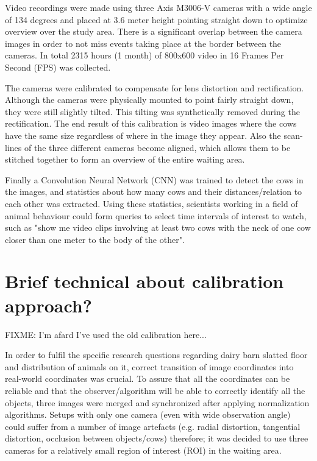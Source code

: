 \documentclass[10pt,a4paper,twocolumn]{article}
\begin{document}
Video recordings were made using three Axis M3006-V cameras with a wide angle of 134 degrees and placed at 3.6 meter height pointing straight down to optimize overview over the study area. There is a significant overlap between the camera images in order to not miss events taking place at the border between the cameras. In total 2315 hours (1 month) of 800x600 video in 16 Frames Per Second (FPS) was collected.

The cameras were calibrated to compensate for lens distortion and rectification. Although the cameras were physically mounted to point fairly straight down, they were still slightly tilted. This tilting was synthetically removed during the rectification. The end result of this calibration is video images where the cows have the same size regardless of where in the image they appear. Also the scan-lines of the three different cameras become aligned, which allows them to be stitched together to form an overview of the entire waiting area.

Finally a Convolution Neural Network (CNN)  was trained to detect the cows in the images, and statistics about how many cows and their distances/relation to each other was extracted. Using these statistics, scientists working in a field of animal behaviour could form queries to select time intervals of interest to watch, such as "show me video clips involving at least two cows with the neck of one cow closer than one meter to the body of the other".

\section{Brief technical about calibration approach?}

FIXME: I'm afard I've used the old calibration here...

In order to fulfil the specific research questions regarding dairy barn slatted floor and distribution of animals on it,
correct transition of image coordinates into real-world coordinates was crucial. To assure that all the coordinates
can be reliable and that the observer/algorithm will be able to correctly identify all the objects, three images were
merged and synchronized after applying normalization algorithms. Setups with only one camera (even with wide
observation angle) could suffer from a number of image artefacts (e.g. radial distortion, tangential distortion,
occlusion between objects/cows) therefore; it was decided to use three cameras for a relatively small region of
interest (ROI) in the waiting area.
\end{document}
